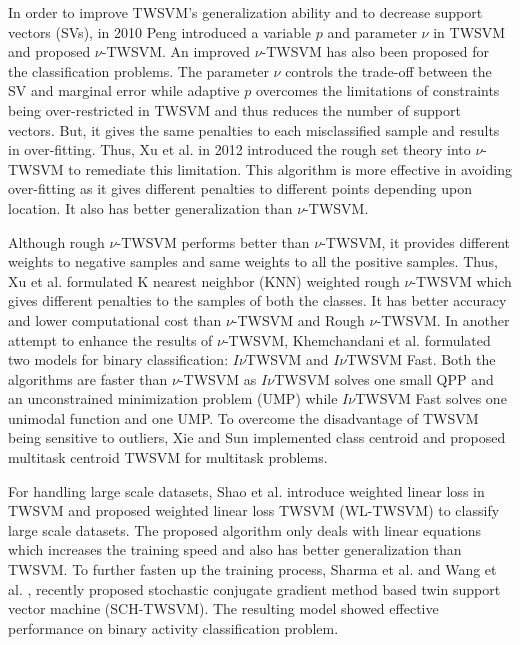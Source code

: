 \documentclass[pdflatex,sn-mathphys]{sn-jnl}%
\theoremstyle{thmstyleone}%
\theoremstyle{thmstyletwo}%
\theoremstyle{thmstylethree}%
\begin{document}
In order to improve TWSVM's generalization ability and to decrease support vectors (SVs), in 2010 Peng \cite{peng2010nu} introduced a variable $p$ and parameter $\nu$ in TWSVM and proposed $\nu$-TWSVM. An improved $\nu$-TWSVM \cite{xu2014improved} has also been proposed for the classification problems.  The parameter $\nu$ controls the trade-off between the SV and marginal error while adaptive $p$ overcomes the limitations of constraints being over-restricted in TWSVM and thus reduces the number of support vectors. But, it gives the same penalties to each misclassified sample and results in over-fitting. Thus, Xu et al.  \cite{xu2012rough} in 2012 introduced the rough set theory into $\nu$-TWSVM to remediate this limitation. This algorithm is more effective in avoiding over-fitting as it gives different penalties to different points depending upon location. It also has better generalization than $\nu$-TWSVM. 

Although rough $\nu$-TWSVM \cite{xu2012rough} performs better than $\nu$-TWSVM, it provides different weights to negative samples and same weights to all the positive samples. Thus, Xu et al. \cite{xu2014knn} formulated K nearest neighbor (KNN) weighted rough $\nu$-TWSVM which gives different penalties to the samples of both the classes. It has better accuracy and lower computational cost than $\nu$-TWSVM and Rough $\nu$-TWSVM. In another attempt to enhance the results of $\nu$-TWSVM, Khemchandani et al. \cite{khemchandani2016improvements} formulated two models for binary classification: $I\nu$TWSVM and $I\nu$TWSVM Fast. Both the algorithms are faster than $\nu$-TWSVM as $I\nu$TWSVM solves one small QPP and an unconstrained minimization problem (UMP) while $I\nu$TWSVM Fast solves one unimodal function and one UMP.  To overcome the disadvantage of TWSVM being sensitive to outliers, Xie and Sun \cite{xie2015multitask} implemented class centroid and proposed multitask centroid TWSVM for multitask problems.

For handling large scale datasets, Shao et al. \cite{shao2015weighted} introduce weighted linear loss in TWSVM and proposed weighted linear loss TWSVM (WL-TWSVM) to classify large scale datasets. The proposed algorithm only deals with linear equations which increases the training speed and also has better generalization than TWSVM.  To further fasten up the training process, Sharma et al. \cite{sharma2018stochastic} and Wang et al. \cite{wang2018insensitive}, recently proposed stochastic conjugate gradient method based twin support vector machine (SCH-TWSVM). The resulting model showed effective performance on binary activity classification problem. 
\end{document}
